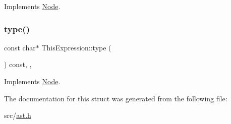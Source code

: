 Implements \hyperlink{struct_node_a10bd7af968140bbf5fa461298a969c71}{Node}.

\mbox{\label{struct_this_expression_a957c14e181fce402594ddf55a0ad4309}} 
\subsubsection{\texorpdfstring{type()}{type()}}
{\footnotesize\ttfamily const char$\ast$ This\+Expression\+::type (\begin{DoxyParamCaption}{ }\end{DoxyParamCaption}) const\hspace{0.3cm}{\ttfamily [inline]}, {\ttfamily [override]}, {\ttfamily [virtual]}}



Implements \hyperlink{struct_node_a82f29420d0a38efcc370352528e94e9b}{Node}.



The documentation for this struct was generated from the following file\+:\begin{DoxyCompactItemize}
\item 
src/\hyperlink{ast_8h}{ast.\+h}\end{DoxyCompactItemize}

